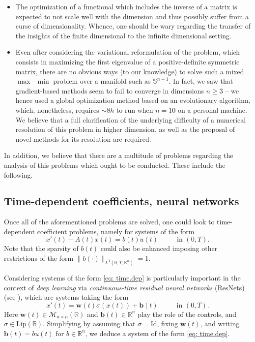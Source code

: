 \documentclass[11pt, a4paper, reqno]{amsart}
\newcommand{\R}{\mathbb{R}}
\def\*#1{\mathbf{#1}}
\theoremstyle{plain}
\numberwithin{equation}{section}
\begin{document}
	\begin{itemize}
	\item The optimization of a functional which includes the inverse of a matrix is expected to not scale well with the dimension and thus possibly suffer from a curse of dimensionality. Whence, one should be wary regarding the transfer of the insights of the finite dimensional to the infinite dimensional setting.
	\smallskip 
	
	\item Even after considering the variational reformulation of the problem, which consists in maximizing the first eigenvalue of a positive-definite symmetric matrix, there are no obvious ways (to our knowledge) to solve such a mixed $\max$--$\min$ problem over a manifold such as $\mathbb{S}^{n-1}$. 
	In fact, we saw that gradient-based methods seem to fail to converge in dimensions $n\geqslant3$ -- we hence used a global optimization method based on an evolutionary algorithm, which, nonetheless, requires $\sim 8h$ to run when $n=10$ on a personal machine. We believe that a full clarification of the underlying difficulty of a numerical resolution of this problem in higher dimension, as well as the proposal of novel methods for its resolution are required.
	\end{itemize}
	
	In addition, we believe that there are a multitude of problems regarding the analysis of this problems which ought to be conducted. 
	These include the following.
	
	\subsection{Time-dependent coefficients, neural networks}
	Once all of the aforementioned problems are solved, one could look to time-dependent coefficient problems, namely for systems of the form	
	\begin{equation} \label{eq: time.dep}
	x'(t)  - A(t) x(t) = b(t) u(t) \hspace{1cm} \text{ in } (0,T).
	\end{equation}
	Note that the sparsity of $b(t)$ could also be enhanced imposing other restrictions of the form $\|b(\cdot)\|_{L^1(0,T; \R^n)} = 1$.
	
	Considering systems of the form \eqref{eq: time.dep} is particularly important in the context of \emph{deep learning} via \emph{continuous-time residual neural networks} (ResNets) (see \citep{weinan2017proposal, esteve2020large, ruiz2021neural, geshkovski2021control}), which are systems taking the form
	\begin{equation} \label{eq: resnet}
	x'(t) = \*w(t) \sigma(x(t)) + \*b(t) \hspace{1cm} \text{ in } (0,T).
	\end{equation}
	Here $\*w(t)\in\mathcal{M}_{n\times n}(\R)$ and $\*b(t)\in\R^n$ play the role of the controls, and $\sigma\in\mathrm{Lip}(\R)$. Simplifying by assuming that $\sigma=\text{Id}$, fixing $\*w(t)$, and writing $\*b(t)=bu(t)$ for $b\in\R^n$, we deduce a system of the form \eqref{eq: time.dep}. 
	
\end{document}
